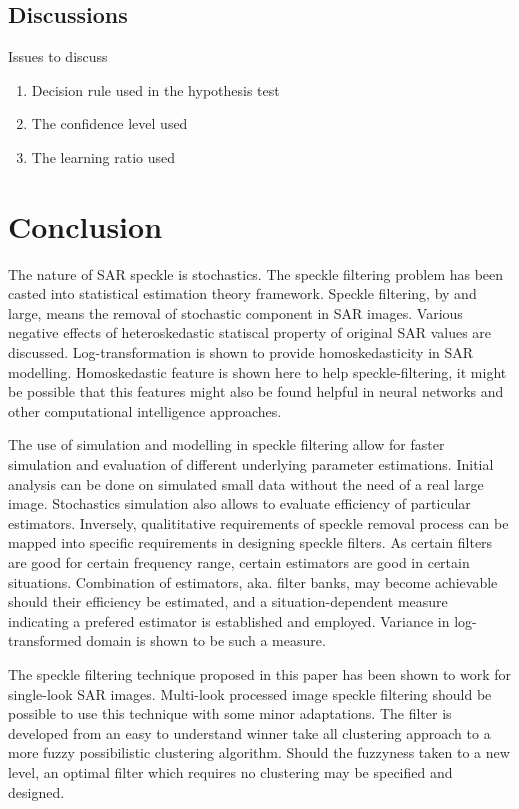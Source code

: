 \documentclass[journal]{IEEEtran}
\begin{document}
\subsection{Discussions}

Issues to discuss
\begin{enumerate}
 \item Decision rule used in the hypothesis test
\item The confidence level used
\item The learning ratio used 
\end{enumerate}

\section{Conclusion}

The nature of SAR speckle is stochastics. The speckle filtering problem has been casted into statistical estimation theory framework. Speckle filtering, by and large, means the removal of stochastic component in SAR images. Various negative effects of heteroskedastic statiscal property of original SAR values are discussed. Log-transformation is shown to provide homoskedasticity in SAR modelling. Homoskedastic feature is shown here to help speckle-filtering, it might be possible that this features might also be found helpful in neural networks and other computational intelligence approaches.

The use of simulation and modelling in speckle filtering allow for faster simulation and evaluation of different underlying parameter estimations. Initial analysis can be done on simulated small data without the need of a real large image. Stochastics simulation also allows to evaluate efficiency of particular estimators. Inversely, qualititative requirements of speckle removal process can be mapped into specific requirements in designing speckle filters. As certain filters are good for certain frequency range, certain estimators are good in certain situations. Combination of estimators, aka. filter banks, may become achievable should their efficiency be estimated, and a situation-dependent measure indicating a prefered estimator is established and employed. Variance in log-transformed domain is shown to be such a measure.

The speckle filtering technique proposed in this paper has been shown to work for single-look SAR images. Multi-look processed image speckle filtering should be possible to use this technique with some minor adaptations. The filter is developed from an easy to understand winner take all clustering approach to a more fuzzy possibilistic clustering algorithm. Should the fuzzyness taken to a new level, an optimal filter which requires no clustering may be specified and designed.



\end{document}
